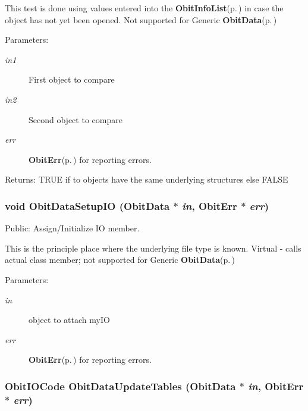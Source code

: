 This test is done using values entered into the {\bf Obit\-Info\-List}{\rm (p.\,\pageref{structObitInfoList})} in case the object has not yet been opened. Not supported for Generic {\bf Obit\-Data}{\rm (p.\,\pageref{structObitData})} \begin{Desc}
\item[Parameters:]
\begin{description}
\item[{\em in1}]First object to compare \item[{\em in2}]Second object to compare \item[{\em err}]{\bf Obit\-Err}{\rm (p.\,\pageref{structObitErr})} for reporting errors. \end{description}
\end{Desc}
\begin{Desc}
\item[Returns:]TRUE if to objects have the same underlying structures else FALSE \end{Desc}
\subsubsection{\setlength{\rightskip}{0pt plus 5cm}void Obit\-Data\-Setup\-IO ({\bf Obit\-Data} $\ast$ {\em in}, {\bf Obit\-Err} $\ast$ {\em err})}\label{ObitData_8c_a26}


Public: Assign/Initialize IO member. 

This is the principle place where the underlying file type is known. Virtual - calls actual class member; not supported for Generic {\bf Obit\-Data}{\rm (p.\,\pageref{structObitData})} \begin{Desc}
\item[Parameters:]
\begin{description}
\item[{\em in}]object to attach my\-IO \item[{\em err}]{\bf Obit\-Err}{\rm (p.\,\pageref{structObitErr})} for reporting errors. \end{description}
\end{Desc}
\subsubsection{\setlength{\rightskip}{0pt plus 5cm}Obit\-IOCode Obit\-Data\-Update\-Tables ({\bf Obit\-Data} $\ast$ {\em in}, {\bf Obit\-Err} $\ast$ {\em err})}\label{ObitData_8c_a23}


